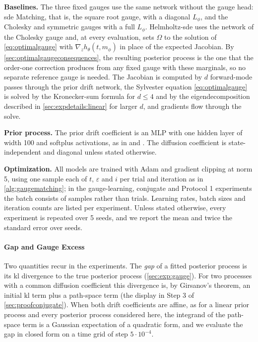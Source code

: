 \documentclass{article} %
\newcommand{\priordrift}{h}
\newcommand{\gauge}{\Omega}
\begin{document}
\textbf{Baselines.} The three fixed gauges use the same network without the gauge head: \gls{sde} Matching, that is, the square root gauge, with a diagonal $L_\phi$, and the Cholesky and symmetric gauges with a full $L_\phi$. Helmholtz-\gls{sde} uses the network of the Cholesky gauge and, at every evaluation, sets $\gauge$ to the solution of \cref{eq:optimalgauge} with $\nabla_z \priordrift_\theta(t, m_\phi)$ in place of the expected Jacobian. By \cref{sec:optimalgaugeconsequences}, the resulting posterior process is the one that the order-one correction produces from any fixed gauge with these marginals, so no separate reference gauge is needed. The Jacobian is computed by $d$ forward-mode passes through the prior drift network, the Sylvester equation \cref{eq:optimalgauge} is solved by the Kronecker-sum formula for $d \le 4$ and by the eigendecomposition described in \cref{sec:expdetails:linear} for larger $d$, and gradients flow through the solve.

\textbf{Prior process.} The prior drift coefficient is an MLP with one hidden layer of width 100 and softplus activations, as in \citet{li2020scalable} and \citet{smith2026closing}. The diffusion coefficient is state-independent and diagonal unless stated otherwise.

\textbf{Optimization.} All models are trained with Adam \citep{kingma2015adam} and gradient clipping at norm 5, using one sample each of $t$, $\varepsilon$ and $i$ per trial and iteration as in \cref{alg:gaugematching}; in the gauge-learning, conjugate and Protocol 1 experiments the batch consists of samples rather than trials. Learning rates, batch sizes and iteration counts are listed per experiment. Unless stated otherwise, every experiment is repeated over 5 seeds, and we report the mean and twice the standard error over seeds.

\paragraph{Gap and Gauge Excess}
Two quantities recur in the experiments. The \emph{gap} of a fitted posterior process is its \gls{kl} divergence to the true posterior process (\cref{sec:exp:gauge}). For two processes with a common diffusion coefficient this divergence is, by Girsanov's theorem, an initial \gls{kl} term plus a path-space term (the display in Step 3 of \cref{sec:proofconjugate}). When both drift coefficients are affine, as for a linear prior process and every posterior process considered here, the integrand of the path-space term is a Gaussian expectation of a quadratic form, and we evaluate the gap in closed form on a time grid of step $5 \cdot 10^{-4}$.
\end{document}
